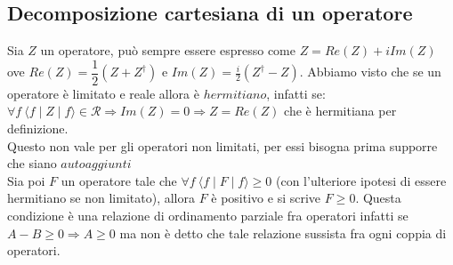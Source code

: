 \subsection{Decomposizione cartesiana di un operatore} %
Sia $Z$ un operatore, può sempre essere espresso come $Z= Re(Z) + iIm(Z)$ ove $Re(Z)=\dfrac{1}{2}(Z+Z^{\dag})$ e $Im(Z)=\frac{i}{2}(Z^{\dag}-Z)$. Abbiamo visto che se un operatore è limitato e reale allora è $hermitiano $, infatti se: \\ $\forall f \ \langle f \mid Z \mid f \rangle \in \mathcal{R} \Rightarrow Im(Z)=0 \Rightarrow Z=Re(Z)$ che è hermitiana per definizione.\\
Questo non vale per gli operatori non limitati, per essi bisogna prima supporre che siano $autoaggiunti$ \\
Sia poi $F$ un operatore tale che $\forall f \ \langle f \mid F \mid f \rangle \geq 0$ (con l'ulteriore ipotesi di essere hermitiano se non limitato), allora $F$ è positivo e si scrive $F \geq 0$. Questa condizione è una relazione di ordinamento parziale fra operatori infatti se $A-B\geq 0 \Rightarrow A\geq 0$ ma non è detto che tale relazione sussista fra ogni coppia di operatori.

